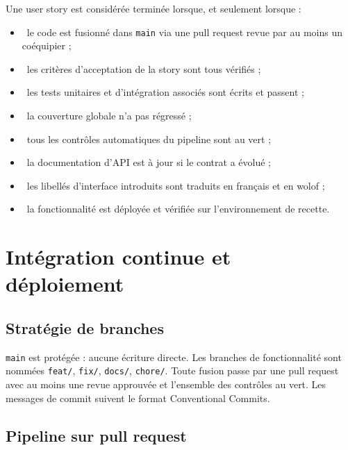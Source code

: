 \documentclass[11pt,a4paper]{article}
\newcommand{\cbox}{{\color{neutral}\ding{113}}~}
\begin{document}
\begin{tcolorbox}[enhanced, colback=white, colframe=accent, boxrule=0.8pt, arc=2pt,
  left=12pt, right=12pt, top=10pt, bottom=10pt,
  title={\sffamily\bfseries Definition of Done}, coltitle=white, colbacktitle=accent,
  fonttitle=\sffamily\bfseries]
Une user story est considérée terminée lorsque, et seulement lorsque :
\begin{itemize}[label={}, leftmargin=1.6em, itemsep=3pt]
  \item \cbox le code est fusionné dans \texttt{main} via une pull request revue par au moins un coéquipier ;
  \item \cbox les critères d'acceptation de la story sont tous vérifiés ;
  \item \cbox les tests unitaires et d'intégration associés sont écrits et passent ;
  \item \cbox la couverture globale n'a pas régressé ;
  \item \cbox tous les contrôles automatiques du pipeline sont au vert ;
  \item \cbox la documentation d'API est à jour si le contrat a évolué ;
  \item \cbox les libellés d'interface introduits sont traduits en français et en wolof ;
  \item \cbox la fonctionnalité est déployée et vérifiée sur l'environnement de recette.
\end{itemize}
\end{tcolorbox}

\section{Intégration continue et déploiement}

\subsection{Stratégie de branches}

\texttt{main} est protégée : aucune écriture directe. Les branches de fonctionnalité sont
nommées \texttt{feat/}, \texttt{fix/}, \texttt{docs/}, \texttt{chore/}. Toute fusion passe
par une pull request avec au moins une revue approuvée et l'ensemble des contrôles au vert.
Les messages de commit suivent le format Conventional Commits.

\subsection{Pipeline sur pull request}
\end{document}
